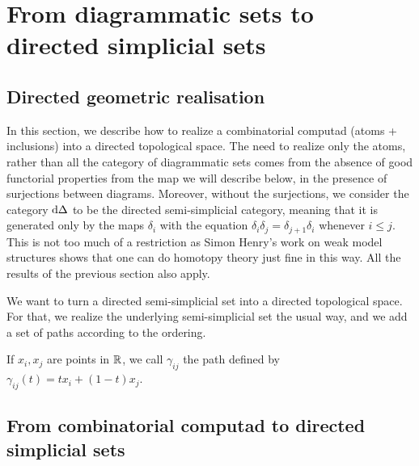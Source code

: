 \section{From diagrammatic sets to directed simplicial sets}

\subsection{Directed geometric realisation}

In this section, we describe how to realize a combinatorial computad (atoms + inclusions) into a directed topological space. The need to realize only the atoms, rather than all the category of diagrammatic sets comes from the absence of good functorial properties from the map we will describe below, in the presence of surjections between diagrams. Moreover, without the surjections, we consider the category \( \mathrm{d}\Delta \) to be the directed semi-simplicial category, meaning that it is generated only by the maps \( \delta_i \) with the equation \( \delta_i\delta_j = \delta_{j+1}\delta_i \) whenever \( i \le j \). This is not too much of a restriction as Simon Henry's work on weak model structures shows that one can do homotopy theory just fine in this way. All the results of the previous section also apply.

We want to turn a directed semi-simplicial set into a directed topological space. For that, we realize the underlying semi-simplicial set the usual way, and we add a set of paths according to the ordering.  

If \( x_i, x_j \) are points in \( \mathbb{R} \), we call \( \gamma_{ij} \) the path defined by \( \gamma_{ij}(t) = tx_i + (1-t)x_j \).

\subsection{From combinatorial computad to directed simplicial sets}

